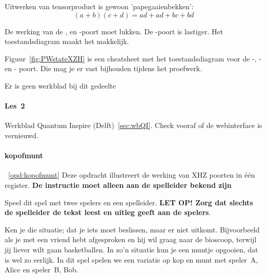 \documentclass[../../main.tex]{subfiles}
\begin{document}
Uitwerken van tensorproduct is gewoon 'papegaaienbekken':
\[(a+b)(c+d)=ad+ad+bc+bd\]

De werking van de ,  en -poort moet lukken. De -poort is lastiger. Het toestandsdiagram maakt het makkelijk.

Figuur~\ref{fig:PWstateXZH} is een cheatsheet met het toestandsdiagram voor de -, - en - poort. Die mag je er vast bijhouden tijdens het proefwerk.

Er is geen werkblad bij dit gedeelte

\paragraph*{Les~2} Werkblad Quantum Inspire (Delft)~\ref{sec:wbQI}.
Check vooraf of de webinterface is vernieuwd.

\paragraph*{kopofmunt}\label{sec:kopofmunt}~\ref{opd:kopofmunt}
Deze opdracht illustreert de werking van XHZ poorten in \'e\'en register. \textbf{De instructie moet alleen aan de spelleider bekend zijn}

Speel dit spel met twee spelers en een spelleider. \textbf{LET OP! Zorg dat slechts de spelleider de tekst leest en uitleg geeft aan de spelers}.

Ken je die situatie; dat je iets moet beslissen, maar er niet uitkomt. Bijvoorbeeld als je met een vriend hebt afgesproken en hij wil graag naar de bioscoop, terwijl jij liever wilt gaan basketballen. In zo'n situatie kun je een muntje opgooien, dat is wel zo eerlijk. In dit spel spelen we een variatie op kop en munt met speler~A, Alice en speler~B, Bob.
\end{document}
